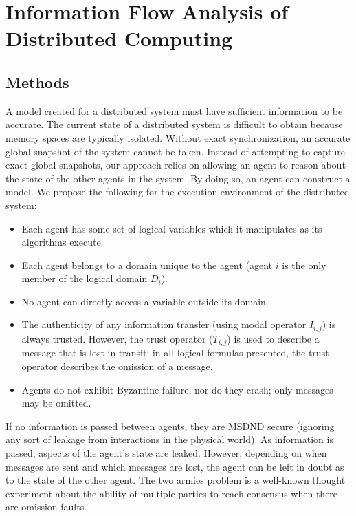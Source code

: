 

\chapter{Information Flow Analysis of Distributed Computing}


\section{Methods}

A model created for a distributed system must have sufficient information to be accurate.
The current state of a distributed system is difficult to obtain because memory spaces are typically isolated.
Without exact synchronization, an accurate global snapshot of the system cannot be taken.
Instead of attempting to capture exact global snapshots, our approach relies on allowing an agent to reason about the state of the other agents in the system.
By doing so, an agent can construct a model.
We propose the following for the execution environment of the distributed system:

\begin{itemize}
    \item Each agent has some set of logical variables which it manipulates as its algorithms execute.
    \item Each agent belongs to a domain unique to the agent (agent $i$ is the only member of the logical domain $D_i$).
    \item No agent can directly access a variable outside its domain.
    \item The authenticity of any information transfer (using modal operator $I_{i,j}$) is always trusted. However, the trust operator ($T_{i,j}$) is used to describe a message that is lost in transit: in all logical formulas presented, the trust operator describes the omission of a message.
    \item Agents do not exhibit Byzantine failure, nor do they crash; only messages may be omitted.
\end{itemize}

If no information is passed between agents, they are MSDND secure (ignoring any sort of leakage from interactions in the physical world).
As information is passed, aspects of the agent's state are leaked.
However, depending on when messages are sent and which messages are lost, the agent can be left in doubt as to the state of the other agent.
The two armies problem is a well-known thought experiment about the ability of multiple parties to reach consensus when there are omission faults.


